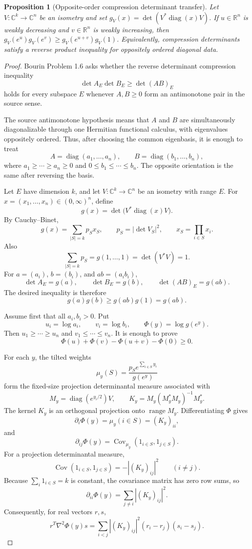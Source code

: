 \documentclass[11pt]{article}
\numberwithin{equation}{section}
\newtheorem{proposition}[theorem]{Proposition}
\theoremstyle{definition}
\theoremstyle{remark}
\newcommand{\1}{\mathbf 1}
\begin{document}
\begin{proposition}[Opposite-order compression determinant transfer]
\label{res:oppositeorder-compressiondeterminant-transfer}
Let \(V:\mathbb C^k\to\mathbb C^n\) be an isometry and set \(g_V(x)=\det(V^*\operatorname{diag}(x)V)\). If \(u\in\mathbb R^n\) is weakly decreasing and \(v\in\mathbb R^n\) is weakly increasing, then \(g_V(e^u)g_V(e^v)\ge g_V(e^{u+v})g_V(1)\). Equivalently, compression determinants satisfy a reverse product inequality for oppositely ordered diagonal data.
\end{proposition}

\begin{proof}
Bourin Problem 1.6 asks whether the reverse determinant compression inequality
\[
\det A_E\det B_E\ge \det(AB)_E
\]
holds for every subspace \(E\) whenever \(A,B\ge0\) form an antimonotone pair in the source sense.

The source antimonotone hypothesis means that \(A\) and \(B\) are simultaneously diagonalizable through one Hermitian functional calculus, with eigenvalues oppositely ordered. Thus, after choosing the common eigenbasis, it is enough to treat
\[
A=\operatorname{diag}(a_1,\ldots,a_n),\qquad
B=\operatorname{diag}(b_1,\ldots,b_n),
\]
where \(a_1\ge\cdots\ge a_n\ge0\) and \(0\le b_1\le\cdots\le b_n\). The opposite orientation is the same after reversing the basis.

Let \(E\) have dimension \(k\), and let \(V:\mathbb C^k\to\mathbb C^n\) be an isometry with range \(E\). For \(x=(x_1,\ldots,x_n)\in(0,\infty)^n\), define
\[
g(x)=\det\bigl(V^*\operatorname{diag}(x)V\bigr).
\]
By Cauchy--Binet,
\[
g(x)=\sum_{|S|=k}p_S x_S,\qquad
p_S=|\det V_S|^2,\qquad
x_S=\prod_{i\in S}x_i.
\]
Also
\[
\sum_{|S|=k}p_S=g(1,\ldots,1)=\det(V^*V)=1.
\]
For \(a=(a_i)\), \(b=(b_i)\), and \(ab=(a_i b_i)\),
\[
\det A_E=g(a),\qquad
\det B_E=g(b),\qquad
\det(AB)_E=g(ab).
\]
The desired inequality is therefore
\[
g(a)g(b)\ge g(ab)g(1)=g(ab).
\]

Assume first that all \(a_i,b_i>0\). Put
\[
u_i=\log a_i,\qquad v_i=\log b_i,\qquad
\Phi(y)=\log g(e^y).
\]
Then \(u_1\ge\cdots\ge u_n\) and \(v_1\le\cdots\le v_n\). It is enough to prove
\[
\Phi(u)+\Phi(v)-\Phi(u+v)-\Phi(0)\ge0.
\]

For each \(y\), the tilted weights
\[
\mu_y(S)=\frac{p_S e^{\sum_{i\in S}y_i}}{g(e^y)}
\]
form the fixed-size projection determinantal measure associated with
\[
M_y=\operatorname{diag}(e^{y_i/2})V,\qquad
K_y=M_y(M_y^*M_y)^{-1}M_y^*.
\]
The kernel \(K_y\) is an orthogonal projection onto \(\operatorname{range} M_y\). Differentiating \(\Phi\) gives
\[
\partial_i\Phi(y)=\mu_y(i\in S)=(K_y)_{ii},
\]
and
\[
\partial_{ij}\Phi(y)=\operatorname{Cov}_{\mu_y}(1_{i\in S},1_{j\in S}).
\]
For a projection determinantal measure,
\[
\operatorname{Cov}(1_{i\in S},1_{j\in S})=-|(K_y)_{ij}|^2\qquad(i\ne j).
\]
Because \(\sum_i1_{i\in S}=k\) is constant, the covariance matrix has zero row sums, so
\[
\partial_{ii}\Phi(y)=\sum_{j\ne i}|(K_y)_{ij}|^2.
\]
Consequently, for real vectors \(r,s\),
\[
r^T\nabla^2\Phi(y)s
=\sum_{i<j}|(K_y)_{ij}|^2(r_i-r_j)(s_i-s_j).
\]


\end{proof}
\end{document}
